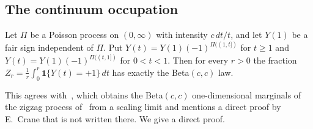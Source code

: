 \subsection{The continuum occupation}

\begin{proposition}\label{prop:D-beta}
Let $\Pi$ be a Poisson process on $(0,\infty)$ with intensity $c\,dt/t$, and
let $Y(1)$ be a fair sign independent of $\Pi$. Put
$Y(t)=Y(1)(-1)^{\Pi((1,t])}$ for $t\ge1$ and $Y(t)=Y(1)(-1)^{\Pi((t,1])}$ for
$0<t<1$. Then for every $r>0$ the fraction
$Z_r=\frac1r\int_0^r\mathbf 1\{Y(t)=+1\}\,dt$ has exactly the Beta$(c,c)$ law.
\end{proposition}

This agrees with~\cite[Remark~6.2]{evw2020}, which obtains the Beta$(c,c)$
one-dimensional marginals of the zigzag process
of~\cite[Definition~6.1]{evw2020} from a scaling limit and mentions a direct
proof by E.~Crane that is not written there. We give a direct proof.

